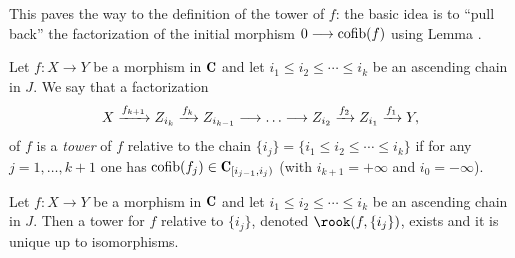 This paves the way to the definition of the tower of $f$: the basic idea is to ``pull back'' the factorization of the initial morphism $0\longrightarrow \operatorname{cofib}(f)$ using Lemma .
\begin{definition} \label{tower.of.f}Let $f\colon X\to Y$ be a morphism in $\C$ and let $i_1\leq i_2\leq\cdots \leq i_k$ be an ascending chain in $J$. We say that a factorization 
\[
X \xto{f_{k+1}} Z_{i_k} \xto{f_k}Z_{i_{k-1}}\to\dots\to Z_{i_{2}} \xto{f_2} Z_{i_1} \xto{f_1} Y,
\]
of $f$ is a \emph{tower} of $f$ relative to the chain $\{i_j\} = \{i_1\leq i_2\leq\cdots \leq i_k\}$ if for any $j=1,\dots,k+1$ one has
$\cofib(f_j)\in \C_{[i_{j-1},i_j)}$ (with $i_{k+1}=+\infty$ and $i_0=-\infty$).
\end{definition}
\begin{proposition}\label{prop:perPostnikov} 
Let $f\colon X\to Y$ be a morphism in $\C$ and let $i_1\leq i_2\leq\cdots \leq i_k$ be an ascending chain in $J$. Then a tower for $f$ relative to $\{i_j\}$, denoted $\rook(f,\{i_j\})$, exists and it is unique up to isomorphisms.
\end{proposition}
